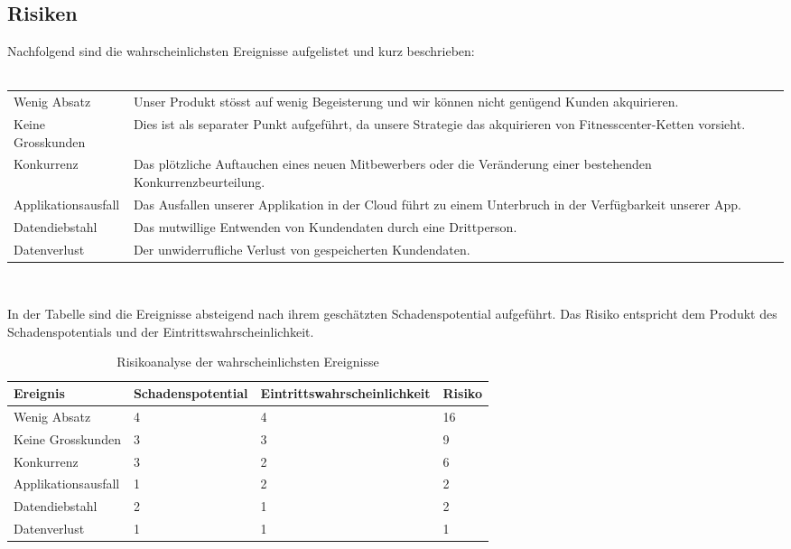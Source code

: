 \subsection{Risiken}
Nachfolgend sind die wahrscheinlichsten Ereignisse aufgelistet und kurz beschrieben:
\\ \\
\begin{tabu} to \linewidth {l X}
	Wenig Absatz & Unser Produkt stösst auf wenig Begeisterung und wir können nicht genügend Kunden akquirieren. \newline \\
	Keine Grosskunden & Dies ist als separater Punkt aufgeführt, da unsere Strategie das akquirieren von Fitnesscenter-Ketten vorsieht. \newline \\
	Konkurrenz & Das plötzliche Auftauchen eines neuen Mitbewerbers oder die Veränderung einer bestehenden Konkurrenzbeurteilung. \newline \\
	Applikationsausfall & Das Ausfallen unserer Applikation in der Cloud führt zu einem Unterbruch in der Verfügbarkeit unserer App. \newline \\
	Datendiebstahl & Das mutwillige Entwenden von Kundendaten durch eine Drittperson. \newline \\ 
	Datenverlust & Der unwiderrufliche Verlust von gespeicherten Kundendaten. \newline \\
\end{tabu}
\\
\clearpage

\noindent In der Tabelle sind die Ereignisse absteigend nach ihrem geschätzten Schadenspotential aufgeführt. Das Risiko entspricht dem Produkt des Schadenspotentials und der Eintrittswahrscheinlichkeit.
\begin{table}[H]
	\centering
	\begin{tabu} to \linewidth {l l l l}
		\toprule
		Ereignis & Schadenspotential & Eintrittswahrscheinlichkeit & Risiko \\
		\midrule
		Wenig Absatz & 4 & 4 & 16 \\
		Keine Grosskunden & 3 & 3 & 9 \\
		Konkurrenz & 3 & 2 & 6 \\
		Applikationsausfall & 1 & 2 & 2 \\
		Datendiebstahl & 2 & 1 & 2 \\
		Datenverlust & 1 & 1 & 1 \\
		\bottomrule
	\end{tabu}
	\label{tbl:risikoanalyse}
	\caption{Risikoanalyse der wahrscheinlichsten Ereignisse}
\end{table}

